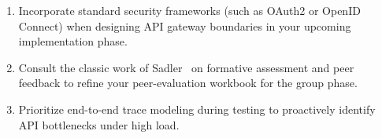 \begin{tcolorbox}[colframe=accent, colback=lightbg, arc=3pt, title={\faCalendarCheck\ Action Plan for Future Assessments}]
\begin{enumerate}[leftmargin=1.5em]
  \item Incorporate standard security frameworks (such as OAuth2 or OpenID Connect) when designing API gateway boundaries in your upcoming implementation phase.
  \item Consult the classic work of Sadler~\cite{sadler1989formative} on formative assessment and peer feedback to refine your peer-evaluation workbook for the group phase.
  \item Prioritize end-to-end trace modeling during testing to proactively identify API bottlenecks under high load.
\end{enumerate}
\end{tcolorbox}
